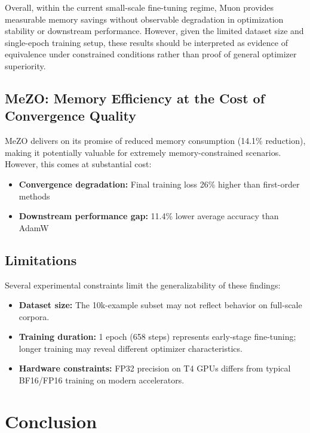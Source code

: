 \documentclass{article}
\begin{document}
Overall, within the current small-scale fine-tuning regime, Muon provides measurable memory savings without observable degradation in optimization stability or downstream performance. However, given the limited dataset size and single-epoch training setup, these results should be interpreted as evidence of equivalence under constrained conditions rather than proof of general optimizer superiority.

\subsection{MeZO: Memory Efficiency at the Cost of Convergence Quality}

MeZO delivers on its promise of reduced memory consumption (14.1\% reduction), making it potentially valuable for extremely memory-constrained scenarios. However, this comes at substantial cost:

\begin{itemize}
    \item \textbf{Convergence degradation:} Final training loss 26\% higher than first-order methods
    \item \textbf{Downstream performance gap:} 11.4\% lower average accuracy than AdamW
\end{itemize}


\subsection{Limitations}

Several experimental constraints limit the generalizability of these findings:

\begin{itemize}
    \item \textbf{Dataset size:} The 10k-example subset may not reflect behavior on full-scale corpora.
    \item \textbf{Training duration:} 1 epoch (658 steps) represents early-stage fine-tuning; longer training may reveal different optimizer characteristics.
    \item \textbf{Hardware constraints:} FP32 precision on T4 GPUs differs from typical BF16/FP16 training on modern accelerators.
\end{itemize}

\section{Conclusion}
\end{document}
